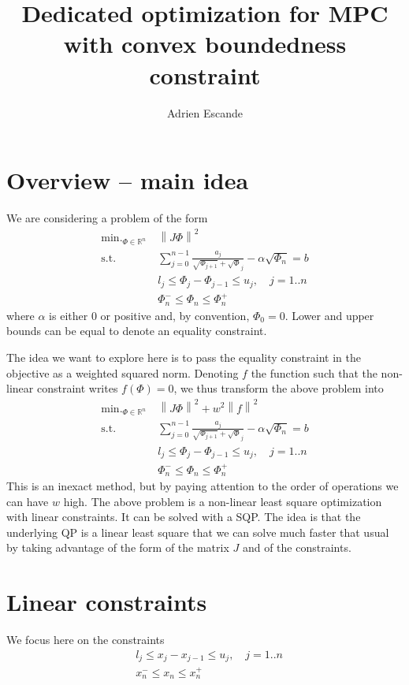 \documentclass[]{article}
\DeclareMathOperator*{\minimize}{\min.}
\newcommand{\st}{\mbox{s.t.}}
\begin{document}
\title{\Large Dedicated optimization for MPC with convex boundedness constraint}
\author{Adrien Escande}

\maketitle

\section{Overview -- main idea}
We are considering a problem of the form
\begin{align}
  \minimize_{\Phi \in \mathbb{R}^n}\ & \left\| J \Phi \right\|^2 \label{eq:problem}\\
  \st \ & \sum_{j=0}^{n-1} \frac{a_j}{\sqrt{\Phi_{j+1}} + \sqrt{\Phi}_j} - \alpha \sqrt{\Phi_n} = b \nonumber\\
        & l_j \leq \Phi_j - \Phi_{j-1} \leq u_j, \quad j=1..n \nonumber\\
        & \Phi_n^- \leq \Phi_n \leq \Phi_n^+ \nonumber
\end{align}
where $\alpha$ is either $0$ or positive and, by convention, $\Phi_0 = 0$. Lower and upper bounds can be equal to denote an equality constraint.

The idea we want to explore here is to pass the equality constraint in the objective as a weighted squared norm. Denoting $f$ the function such that the non-linear constraint writes $f(\Phi) = 0$, we thus transform the above problem into
\begin{align}
  \minimize_{\Phi \in \mathbb{R}^n}\ & \left\| J \Phi \right\|^2 + w^2 \left\|f\right\|^2\\
  \st \ & \sum_{j=0}^{n-1} \frac{a_j}{\sqrt{\Phi_{j+1}} + \sqrt{\Phi}_j} - \alpha \sqrt{\Phi_n} = b \nonumber\\
        & l_j \leq \Phi_j - \Phi_{j-1} \leq u_j, \quad j=1..n \nonumber\\
        & \Phi_n^- \leq \Phi_n \leq \Phi_n^+ \nonumber
\end{align}
This is an inexact method, but by paying attention to the order of operations we can have $w$ high. The above problem is a non-linear least square optimization with linear constraints. It can be solved with a SQP. The idea is that the underlying QP is a linear least square that we can solve much faster that usual by taking advantage of the form of the matrix $J$ and of the constraints.

\section{Linear constraints}
We focus here on the constraints
\begin{align*}
 & l_j \leq x_j - x_{j-1} \leq u_j, \quad j=1..n \label{eq:inequality}\\
 & x_n^- \leq x_n \leq x_n^+
\end{align*}
\end{document}
